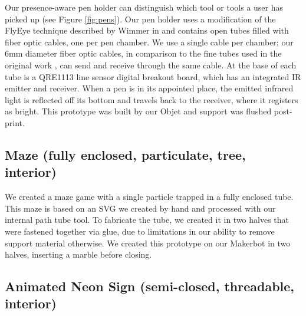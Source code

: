 Our presence-aware pen holder can distinguish which tool or tools a user has picked up (see Figure \ref{fig:pens}).  Our pen holder uses a modification of the FlyEye technique described by Wimmer in \cite{Wimmer-flyeye} and contains open tubes filled with fiber optic cables, one per pen chamber.  We use a single cable per chamber; our 6mm diameter fiber optic cables, in comparison to the fine tubes used in the original work , can send and receive through the same cable.  At the base of each tube is a QRE1113 line sensor digital breakout board, which has an integrated IR emitter and receiver.   When a pen is in its appointed place, the emitted infrared light is reflected off its bottom and travels back to the receiver, where it registers as bright.  This prototype was built by our Objet and support was flushed post-print. 

\subsection{Maze (fully enclosed, particulate, tree, interior)}


We created a maze game with a single particle trapped in a fully enclosed tube.  This maze is based on an SVG we created by hand and processed with our internal path tube tool.  To fabricate the tube, we created it in two halves that were fastened together via glue, due to limitations in our ability to remove support material otherwise.  We created this prototype on our Makerbot in two halves, inserting a marble before closing.

\subsection{Animated Neon Sign (semi-closed, threadable, interior)}

